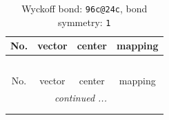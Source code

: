 \documentclass[fleqn,8pt]{jsarticle}
\begin{document}
\renewcommand{\arraystretch}{1.2}
\begin{longtable}{cccc}
\caption{Wyckoff bond: {\tt 96c@24c}, bond symmetry: {\tt 1}}
 \\
 \hline \hline
No. & vector & center & mapping \\ \hline \endfirsthead

\multicolumn{3}{l}{\tablename\ \thetable{}} \\
 \hline \hline
No. & vector & center & mapping \\ \hline \endhead

 \hline \hline
\multicolumn{3}{r}{\footnotesize\it continued ...} \\ \endfoot

 \hline \hline
\multicolumn{3}{r}{} \\ \endlastfoot


\end{longtable}
\end{document}
